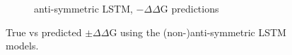 \documentclass{article}
\newcommand{\dd}{$\Delta\Delta$}
\begin{document}
\begin{figure}[!htb]
\begin{subfigure}[b]{0.49\textwidth}
        \caption{anti-symmetric LSTM, $-$\dd G predictions}
        \label{fig:lstmare}
    \end{subfigure}
    \caption{True vs predicted $\pm$\dd G using the (non-)anti-symmetric LSTM models.}
    \label{fig:results}
\end{figure}
\FloatBarrier

\clearpage

\end{document}

